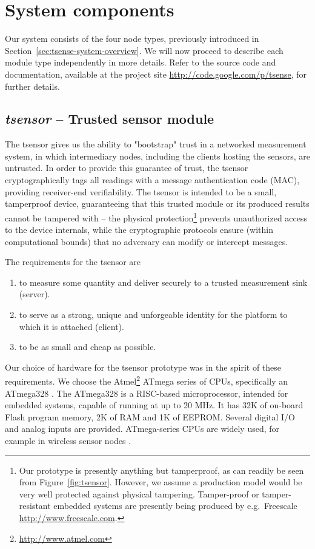 \section{System components}

Our system consists of the four node types, previously introduced in Section~\ref{sec:tsense-system-overview}. We will now proceed to describe each module type independently in more details. Refer to the source code and documentation, available at the project site \url{http://code.google.com/p/tsense}, for further details.

\subsection{\textit{tsensor} -- Trusted sensor module}
\label{tsensor}

The tsensor gives us the ability to "bootstrap" trust in a networked measurement system, in which intermediary nodes, including the clients hosting the sensors, are untrusted. In order to provide this guarantee of trust, the tsensor cryptographically tags all readings with a message authentication code (MAC), providing receiver-end verifiability. The tsensor is intended to be a small, tamperproof device, guaranteeing that this trusted module or its produced results cannot be tampered with -- the physical protection\footnote{Our prototype is presently anything but tamperproof, as can readily be seen from Figure~\ref{fig:tsensor}. However, we assume a production model would be very well protected against physical tampering. Tamper-proof or tamper-resistant embedded systems are presently being produced by e.g.\ Freescale \url{http://www.freescale.com}.} prevents unauthorized access to the device internals, while the cryptographic protocols ensure (within computational bounds) that no adversary can modify or intercept messages. 

The requirements for the tsensor are
\begin{enumerate}
\item to measure some quantity and deliver securely to a trusted measurement sink (server).
\item to serve as a strong, unique and unforgeable identity for the platform to which it is attached (client).
\item to be as small and cheap as possible.
\end{enumerate}

Our choice of hardware for the tsensor prototype was in the spirit of these requirements. We choose the Atmel\footnote{\url{http://www.atmel.com}} ATmega series of CPUs, specifically an ATmega328 \cite{atmel-atmega-series-2010}. The ATmega328 is a RISC-based microprocessor, intended for embedded systems, capable of running at up to 20 MHz. It has 32K of on-board Flash program memory, 2K of RAM and 1K of EEPROM. Several digital I/O and analog inputs are provided. ATmega-series CPUs are widely used, for example in wireless sensor nodes .

